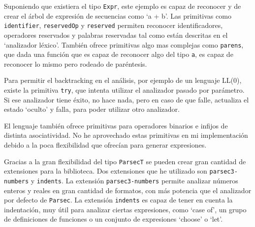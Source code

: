 \documentclass[class=article, crop=false]{standalone}
\begin{document}
Suponiendo que existiera el tipo \verb`Expr`, este ejemplo es capaz de reconocer y de crear
el árbol de expresión de secuencias como `a + b'. Las primitivas como \verb`identifier`,
\verb`reservedOp` y \verb`reserved` permiten reconocer identificadores, operadores reservados
y palabras reservadas tal como están descritas en el `analizador léxico'. También ofrece
primitivas algo mas complejas como \verb`parens`, que dada una función que es capaz de
reconocer algo del tipo \verb`a`, es capaz de reconocer lo mismo pero rodeado de paréntesis.

Para permitir el backtracking en el análisis, por ejemplo de un lenguaje LL(0), existe la
primitiva \verb`try`, que intenta utilizar el analizador pasado por parámetro. Si ese
analizador tiene éxito, no hace nada, pero en caso de que falle, actualiza el estado `oculto'
y falla, para poder utilizar otro analizador.

El lenguaje también ofrece primitivas para operadores binarios e infijos de distinta
asociatividad. No he aprovechado estas primitivas en mi implementación debido a la poca
flexibilidad que ofrecían para generar expresiones.

Gracias a la gran flexibilidad del tipo \verb`ParsecT` se pueden crear gran cantidad de
extensiones para la biblioteca. Dos extensiones que he utilizado son \verb`parsec3-numbers` y
\verb`indents`. La extensión \verb`parsec3-numbers` permite analizar números enteros y reales
en gran cantidad de formatos, con más potencia que el analizador por defecto de
\verb`Parsec`. La extensión \verb`indents` es capaz de tener en cuenta la indentación, muy
útil para analizar ciertas expresiones, como `case of', un grupo de definiciones de funciones
o un conjunto de expresiones `choose' o `let'.
\end{document}

